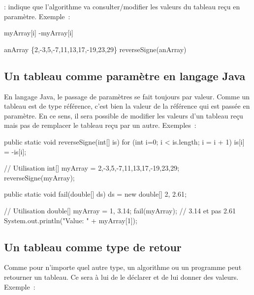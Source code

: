 		\In\Out : indique que l’algorithme va consulter/modifier les valeurs du
		tableau reçu en paramètre. Exemple~:
			
		\begin{pseudocode}
					\Let myArray[i] \Gets -myArray[i]
				\EndFor
			\EndAlgo 

			\Empty
			\Let anArray \Gets	
				{}
				\{2,-3,5,-7,11,13,17,-19,23,29\}
			\Stmt reverseSigne(anArray)
		\end{pseudocode}


		\subsection{Un tableau comme paramètre en langage Java}

		En langage Java, le passage de paramètres se fait toujours par valeur.
		Comme un tableau est de type référence, c'est bien la valeur de la
		référence qui est passée en paramètre. En ce sens, il sera possible de
		modifier les valeurs d'un tableau reçu mais pas de remplacer le tableau
		reçu par un autre. Exemples~:

\begin{java}
	public static void reverseSigne(int[] is){
		for (int i=0; i < is.length; i = i + 1){
			is[i] = -is[i];
		}
	}

	// Utilisation
	int[] myArray = {2,-3,5,-7,11,13,17,-19,23,29};
	reverseSigne(myArray);
\end{java}

\begin{java}
	public static void fail(double[] ds){
		ds = new double[] {2, 2.61};
	}


	// Utilisation
	double[] myArray = {1, 3.14};
	fail(myArray);
	// 3.14 et pas 2.61
	System.out.println("Value: " + myArray[1]);		

\end{java}



		\subsection{Un tableau comme type de retour}

		Comme pour n’importe quel autre type, un algorithme ou un programme peut
		retourner un tableau.  Ce sera à lui de le déclarer et de lui donner des
		valeurs.  Exemple~:
			
